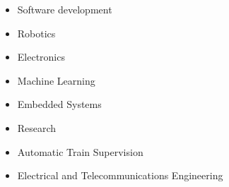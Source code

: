 \documentclass[10pt,a4paper,ragged2e,withhyper]{altacv}
\begin{document}
\begin{paracol}{2}



\nocite{*}


\printbibliography[heading=pubtype,title={\printinfo{\faFile*[regular]}{Academic papers}},type=article]



\switchcolumn


\begin{itemize}
  \item Software development
  \item Robotics
  \item Electronics
  \item Machine Learning
  \item Embedded Systems
  \item Research
  \item Automatic Train Supervision
  \item Electrical and Telecommunications Engineering
\end{itemize}


\divider

\divider


\medskip



\end{paracol}
\end{document}
